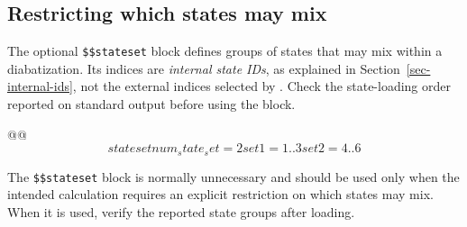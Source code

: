 \subsection{Restricting which states may mix}\label{sec-stateset}
The optional \texttt{\$\$stateset} block defines groups of states that may mix within a diabatization. Its indices are \emph{internal state IDs}, as explained in Section~\ref{sec-internal-ids}, not the external indices selected by . Check the state-loading order reported on standard output before using the block.
\begin{lst-script}[escapechar=@]
@@
$$stateset
  num_state_set = 2
  set 1 = 1..3
  set 2 = 4..6
$$
\end{lst-script}
The \texttt{\$\$stateset} block is normally unnecessary and should be used only when the intended calculation requires an explicit restriction on which states may mix. When it is used, verify the reported state groups after loading.
